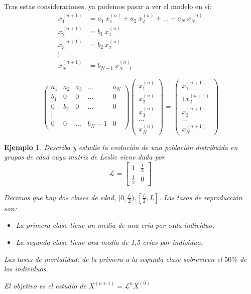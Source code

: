 \documentclass[11pt, a4paper]{article}
\newif\IfInSansMode
\numberwithin{equation}{section}
\theoremstyle{theorem-style}
\theoremstyle{definition-style}
\theoremstyle{remark-style}
\theoremstyle{example-style}
\newtheorem{ejemplo}{Ejemplo}[section]
\begin{document}
    Tras estas consideraciones, ya podemos pasar a ver el modelo en sí:
    \begin{align*}
        \label{}
        x_1^{(n+1)} &= a_1 \ x_1^{(n)} + a_2 \ x_2^{(n)} + \hdots + a_N \ x_N^{(n)}  \\
        x_2^{(n+1)} &= b_1 \ x_1^{(n)} \\
        x_3^{(n+1)} &= b_2 \ x_2^{(n)} \\
        \vdots \\
        x_N^{(n+1)} &= b_{N-1} \ x_{N-1}^{(n)} 
    \end{align*}
    
    $$
    \begin{pmatrix}
        a_1 & a_2 & a_3 & \hdots & a_N \\
        b_1 & 0 & 0 & \hdots & 0 \\
        0 & b_2 & 0 & \hdots & 0 \\
        \vdots & & & & \\
        0 & 0 & \hdots & b_N-1 & 0
    \end{pmatrix} \begin{pmatrix}
        x_1^{(n)} \\
        x_2^{(n)} \\
        x_3^{(n)} \\
        \hdots \\
        x_N^{(n)}
    \end{pmatrix} = \begin{pmatrix}
        x_1^{(n+1)} \\
        1x_2^{(n+1)} \\
        x_3^{(n+1)} \\
        \hdots \\
        x_N^{(n+1)}
    \end{pmatrix}$$


    \begin{ejemplo}
        Describa y estudie la evolución de una población distribuida en grupos de edad cuya matriz de Leslie viene dada por $$\mathcal L = \begin{bmatrix}
            1 & \frac{1}{3} \\
            \frac{1}{2} & 0
        \end{bmatrix}$$

        Decimos que hay dos clases de edad, $[0, \frac{L}{2}), [ \frac{L}{2}, L ]$. Las tasas de reproducción son: \begin{itemize}
            \item La primera clase tiene un media de una cría por cada individuo.
            \item La segunda clase tiene una media de 1,5 crías por individuo.
        \end{itemize}
        Las tasas de mortalidad: de la primera a la segunda clase sobreviven el $50\%$ de los individuos.

        El objetivo es el estudio de $X^{(n+1)} = \mathcal L^nX^{(0)}$

    \end{ejemplo}
\end{document}
